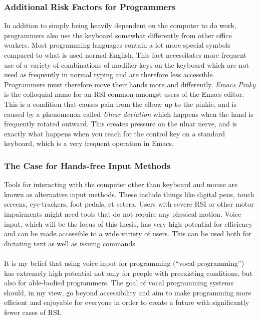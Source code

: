 \documentclass[../thesis.tex]{subfiles}
\begin{document}
\subsubsection{Additional Risk Factors for Programmers}
In addition to simply being heavily dependent on the computer to do work,
programmers also use the keyboard somewhat differently from other office workers.
Most programming languages contain a lot more special symbols compared to what is used
normal English.
This fact necessitates more frequent use of a variety of combinations of modifier keys on the keyboard
which are not used as frequently in normal typing and are therefore less accessible.
Programmers must therefore move their hands more and differently.
\textit{Emacs Pinky} is the colloquial name for an RSI common amongst users of the Emacs editor.
This is a condition that causes pain from the elbow up to the pinkie, and is caused
by a phenomenon called \textit{Ulnar deviation} which happens when the hand is frequently rotated
outward.
This creates pressure on the ulnar nerve, and is exactly what happens when you reach for the control key on a standard keyboard,
which is a very frequent operation in Emacs.

\subsubsection{The Case for Hands-free Input Methods}
Tools for interacting with the computer other than keyboard and mouse
are known as alternative input methods.
These include things like digital pens, touch screens, eye-trackers, foot pedals, et cetera.
Users with severe RSI or other motor impairments might need tools that do not require any physical motion.
Voice input, which will be the focus of this thesis, has very high potential for efficiency and can be made accessible to a wide variety of users.
This can be used both for dictating text as well as issuing commands.
\paragraph{}
It is my belief that using voice input for programming (``vocal programming'')
has extremely high potential not only for people with preexisting conditions, 
but also for able-bodied programmers.
The goal of vocal programming systems should, in my view, go beyond
accessibility and aim to make programming more efficient and enjoyable for everyone
in order to create a future with significantly fewer cases of RSI.
\end{document}
